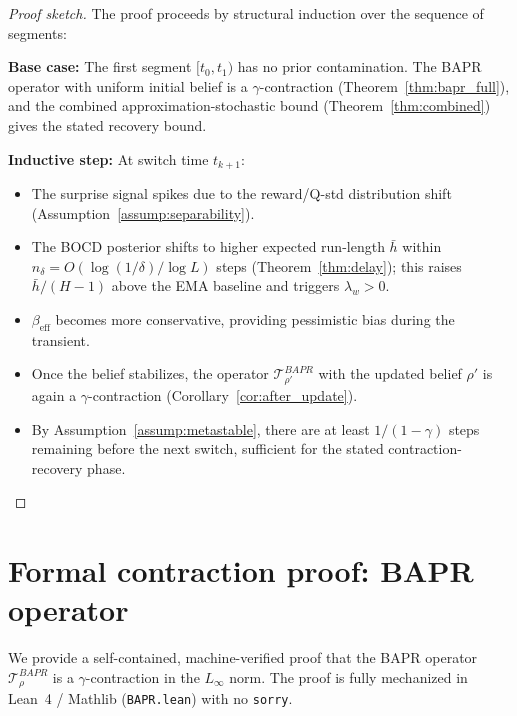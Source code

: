 \begin{proof}[Proof sketch]
The proof proceeds by structural induction over the sequence of segments:

\textbf{Base case:} The first segment $[t_0, t_1)$ has no prior contamination. The BAPR operator with uniform initial belief is a $\gamma$-contraction (Theorem~\ref{thm:bapr_full}), and the combined approximation-stochastic bound (Theorem~\ref{thm:combined}) gives the stated recovery bound.

\textbf{Inductive step:} At switch time $t_{k+1}$:
\begin{itemize}
    \item The surprise signal spikes due to the reward/Q-std distribution shift (Assumption~\ref{assump:separability}).
    \item The BOCD posterior shifts to higher expected run-length $\bar h$ within $n_\delta = O(\log(1/\delta)/\log L)$ steps (Theorem~\ref{thm:delay}); this raises $\bar h/(H{-}1)$ above the EMA baseline and triggers $\lambda_w > 0$.
    \item $\beta_{\text{eff}}$ becomes more conservative, providing pessimistic bias during the transient.
    \item Once the belief stabilizes, the operator $\mathcal{T}^{BAPR}_{\rho'}$ with the updated belief $\rho'$ is again a $\gamma$-contraction (Corollary~\ref{cor:after_update}).
    \item By Assumption~\ref{assump:metastable}, there are at least $1/(1-\gamma)$ steps remaining before the next switch, sufficient for the stated contraction-recovery phase. \qedhere
\end{itemize}
\end{proof}


\section{Formal contraction proof: BAPR operator}
\label{app:contraction}

We provide a self-contained, machine-verified proof that the BAPR operator $\mathcal{T}^{BAPR}_\rho$ is a $\gamma$-contraction in the $L_\infty$ norm. The proof is fully mechanized in Lean~4 / Mathlib (\texttt{BAPR.lean}) with no \texttt{sorry}.

